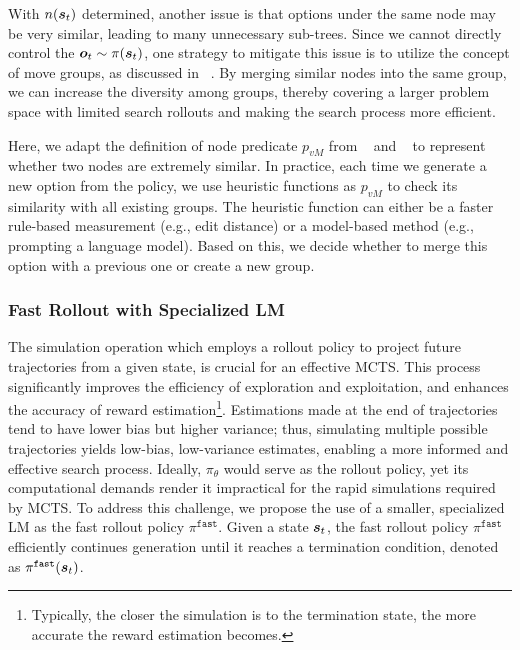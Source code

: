 With $n({\bm{s}}_t)$ determined, another issue is that options under the same node may be very similar, leading to many unnecessary sub-trees. Since we cannot directly control the ${\bm{o}}_t \sim \pi({\bm{s}}_t)$, one strategy to mitigate this issue is to utilize the concept of move groups, as discussed in ~\cite{van2012revisiting}. By merging similar nodes into the same group, we can increase the diversity among groups, thereby covering a larger problem space with limited search rollouts and making the search process more efficient.

Here, we adapt the definition of node predicate $p_{vM}$ from ~\cite{abel2018state} and ~\cite{fu2024accelerating} to represent whether two nodes are extremely similar. In practice, each time we generate a new option from the policy, we use heuristic functions as $p_{vM}$ to check its similarity with all existing groups. The heuristic function can either be a faster rule-based measurement (e.g., edit distance) or a model-based method (e.g., prompting a language model). Based on this, we decide whether to merge this option with a previous one or create a new group. 


\subsubsection{Fast Rollout with Specialized LM}

The simulation operation which employs a rollout policy to project future trajectories from a given state, is crucial for an effective MCTS. This process significantly improves the efficiency of exploration and exploitation, and enhances the accuracy of reward estimation\footnote{Typically, the closer the simulation is to the termination state, the more accurate the reward estimation becomes.}. Estimations made at the end of trajectories tend to have lower bias but higher variance; thus, simulating multiple possible trajectories yields low-bias, low-variance estimates, enabling a more informed and effective search process. Ideally, $\pi_\theta$ would serve as the rollout policy, yet its computational demands render it impractical for the rapid simulations required by MCTS. To address this challenge, we propose the use of a smaller, specialized LM as the fast rollout policy $\pi^{\mathtt{fast}}$. Given a state ${\bm{s}}_t$, the fast rollout policy $\pi^{\mathtt{fast}}$ efficiently continues generation until it reaches a termination condition, denoted as $\pi^{\mathtt{fast}}({\bm{s}}_t)$.

